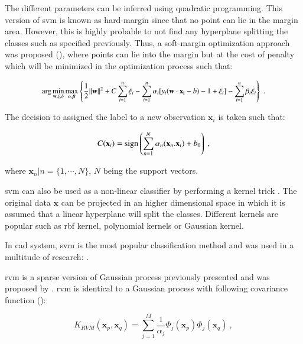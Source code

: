 \begin{enumerate}[leftmargin=*]
The different parameters can be inferred using quadratic programming. This version of \ac{svm} is known as hard-margin since that no point can lie in the margin area. However, this is highly probable to not find any hyperplane splitting the classes such as specified previously. Thus, a soft-margin optimization approach was proposed (\cite{Cortes1995}), where points can lie into the margin but at the cost of penalty which will be minimized in the optimization process such that:

\begin{equation}
\small
\arg\min_{\mathbf{w},\mathbf{\xi}, b } \max_{\boldsymbol{\alpha},\boldsymbol{\beta} } \left\{ \frac{1}{2}\|\mathbf{w}\|^2+C \sum_{i=1}^n \xi_i - \sum_{i=1}^{n}{\alpha_i[y_i(\mathbf{w}\cdot \mathbf{x_i} - b) -1 + \xi_i]} - \sum_{i=1}^{n} \beta_i \xi_i \right\} \ .
\end{equation}

The decision to assigned the label to a new observation $\mathbf{x}_i$ is taken such that:

\begin{equation}
	C(\mathbf{x}_i) = \operatorname*{sign} \left( \sum_{n=1}^{N} \alpha_n (\mathbf{x}_n . \mathbf{x}_i) + b_0 \right) \ ,
	\label{eq:svmdec} 
\end{equation}

\noindent where $\mathbf{x}_n|n=\{1,\cdots,N\}$, $N$ being the support vectors.

\ac{svm} can also be used as a non-linear classifier by performing a kernel trick \cite{Boser1992}. The original data $\mathbf{x}$ can be projected in an higher dimensional space in which it is assumed that a linear hyperplane will split the classes. Different kernels are popular such as \ac{rbf} kernel, polynomial kernels or Gaussian kernel.

In \ac{cad} system, \ac{svm} is the most popular classification method and was used in a multitude of research: \cite{Artan2009,Artan2010,Chan2003,Kelm2007,Litjens2011,Litjens2012,Liu2013,Lopes2011,Niaf2011,Niaf2012,Ozer2009,Ozer2010,Parfait2012,Peng2013,Sung2011,Tiwari2012,Vos2008,Vos2008a,Vos2010,Vos2012}.

\Acf{rvm} is a sparse version of Gaussian process previously presented and was proposed by \cite{Tipping2001}. \ac{rvm} is identical to a Gaussian process with following covariance function (\cite{Quinonero-Candela2002}):

\begin{equation}
	K_{RVM}(\mathbf{x}_p,\mathbf{x}_q) = \sum_{j=1}^{M} \frac{1}{\alpha_j} \Phi_j ( \mathbf{x}_p ) \Phi_j ( \mathbf{x}_q ) \ ,
 	\label{eq:rvm}
\end{equation}


\end{enumerate}
